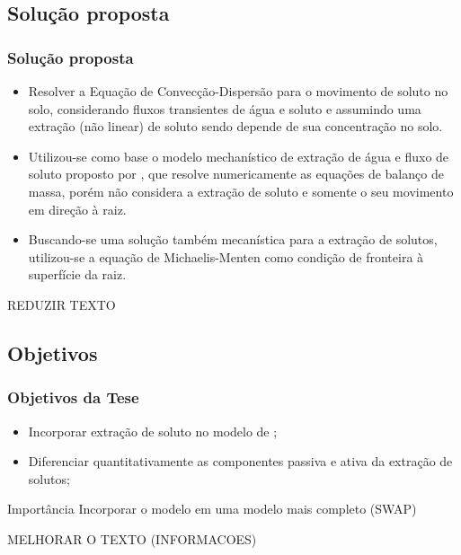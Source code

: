 \subsection{Solução proposta}
\begin{frame}\frametitle{Solução proposta}
  \begin{itemize}
    \item Resolver a Equação de Convecção-Dispersão para o movimento de soluto no solo, considerando fluxos transientes de água e soluto e assumindo uma extração (não linear) de soluto sendo depende de sua concentração no solo.

    \item Utilizou-se como base o modelo mechanístico de extração de água e fluxo de soluto proposto por \cite{liersolute},
  que resolve numericamente as equações de balanço de massa, porém não considera a extração de soluto e somente o seu movimento em direção à raiz.

    \item Buscando-se uma solução também mecanística para a extração de solutos, utilizou-se a equação de Michaelis-Menten como condição de fronteira à superfície da raiz.
  \end{itemize}

  REDUZIR TEXTO
\end{frame}


\subsection{Objetivos}
\begin{frame}\frametitle{Objetivos da Tese}
  \begin{itemize}
  \item Incorporar extração de soluto no modelo de \cite{liersolute};
  \item Diferenciar quantitativamente as componentes passiva e ativa da extração de solutos;
  \end{itemize}
  \begin{block}{Importância}
    Incorporar o modelo em uma modelo mais completo (SWAP)
  \end{block}
  MELHORAR O TEXTO (INFORMACOES)
\end{frame}


